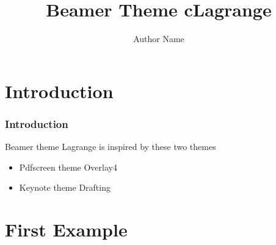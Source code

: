 \documentclass[11pt,xcolor={rgb}]{beamer}
\begin{document}
\title{Beamer Theme cLagrange}
\author{Author Name}

\begin{frame}[plain]
\titlepage
\end{frame}

\section{Introduction}

\begin{frame}
\frametitle{Introduction}
Beamer theme Lagrange is inspired by these two themes
\begin{itemize}
  \item Pdfscreen theme Overlay4
  \item Keynote theme Drafting
\end{itemize}
\end{frame}

\section{First Example}

\end{document}
